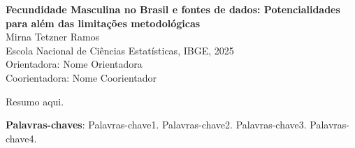\begin{resumo}

\begin{center} 
  
\textbf{Fecundidade Masculina no Brasil e fontes de dados: Potencialidades para além das limitações metodológicas}
\\[1em]
  Mirna Tetzner Ramos \\
  Escola Nacional de Ciências Estatísticas, IBGE, 2025\\[1em]
  Orientadora: Nome Orientadora\\
  Coorientadora: Nome Coorientador
\end{center}

\begin{SingleSpace}
Resumo aqui.

\end{SingleSpace}
  

 \textbf{Palavras-chaves}: Palavras-chave1. Palavras-chave2. Palavras-chave3. Palavras-chave4.  
\end{resumo}